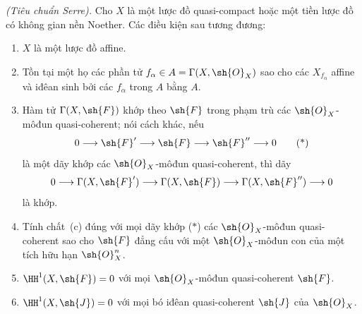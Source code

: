 \documentclass[oneside,10pt]{amsart}
\makeatletter
\newcommand{\ega@arrow}[2]{\mathchoice{#1}{#2}{#2}{#2}}
\renewcommand{\to}{\ega@arrow{\longrightarrow}{\rightarrow}}
\let\EGAOriginalLabel\label
\renewcommand{\label}[1]{\phantomsection\EGAOriginalLabel{#1}}
\makeatother
\begin{document}
\begin{theorem}[5.2.1]
\label{II.5.2.1}
\emph{(Tiêu chuẩn Serre).}
Cho $X$ là một lược đồ quasi-compact hoặc một tiền lược đồ có không gian nền Noether.
Các điều kiện sau tương đương:
\begin{enumerate}
  \item[{\rm(a)}] $X$ là một lược đồ affine.
  \item[{\rm(b)}] Tồn tại một họ các phần tử $f_\alpha\in A=\Gamma(X,\sh{O}_X)$ sao cho các $X_{f_\alpha}$ affine và iđêan sinh bởi các $f_\alpha$ trong $A$ bằng $A$.
  \item[{\rm(c)}] Hàm tử $\Gamma(X,\sh{F})$ khớp theo $\sh{F}$ trong phạm trù các $\sh{O}_X$-môđun quasi-coherent; nói cách khác, nếu
    \[
      0\to\sh{F}'\to\sh{F}\to\sh{F}''\to0
      \tag{*}
    \]
    là một dãy khớp các $\sh{O}_X$-môđun quasi-coherent, thì dãy
    \[
      0\to\Gamma(X,\sh{F}')\to\Gamma(X,\sh{F})\to\Gamma(X,\sh{F}'')\to0
    \]
    là khớp.
  \item[{\rm(c')}] Tính chất~{\rm(c)} đúng với mọi dãy khớp {\rm($*$)} các $\sh{O}_X$-môđun quasi-coherent sao cho $\sh{F}$ đẳng cấu với một $\sh{O}_X$-môđun con của một tích hữu hạn $\sh{O}_X^n$.
  \item[{\rm(d)}] $\HH^1(X,\sh{F})=0$ với mọi $\sh{O}_X$-môđun quasi-coherent $\sh{F}$.
  \item[{\rm(d$'$)}] $\HH^1(X,\sh{J})=0$ với mọi bó iđêan quasi-coherent $\sh{J}$ của $\sh{O}_X$.
\end{enumerate}
\end{theorem}
\end{document}

